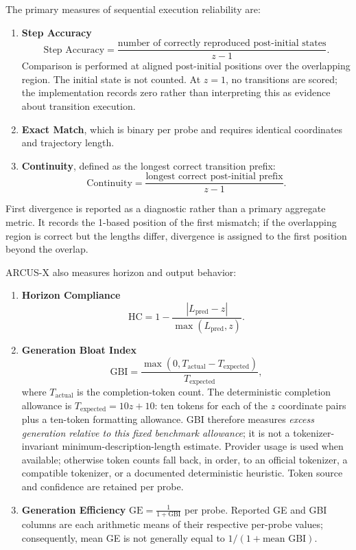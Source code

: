 \documentclass{article}
\begin{document}
The primary measures of sequential execution reliability are:
\begin{enumerate}
    \item \textbf{Step Accuracy}
    \[
    \text{Step Accuracy} =
    \frac{\text{number of correctly reproduced post-initial states}}
    {z-1}.
    \]
    Comparison is performed at aligned post-initial positions over the
    overlapping region. The initial state is not counted. At $z=1$,
    no transitions are scored; the implementation records zero rather
    than interpreting this as evidence about transition execution.

    \item \textbf{Exact Match}, which is binary per probe and requires identical coordinates and trajectory length.

    \item \textbf{Continuity}, defined as the longest correct transition
    prefix:
    \[
    \text{Continuity} =
    \frac{\text{longest correct post-initial prefix}}
    {z-1}.
    \]
\end{enumerate}

First divergence is reported as a diagnostic rather than a primary aggregate metric. It records the 1-based position of the first mismatch; if the overlapping region is correct but the lengths differ, divergence is assigned to the first position beyond the overlap.

ARCUS-X also measures horizon and output behavior:
\begin{enumerate}
    \item \textbf{Horizon Compliance}
    \[
    \text{HC} =
    1 -
    \frac{\left|L_{\mathrm{pred}}-z\right|}
    {\max(L_{\mathrm{pred}},z)}.
    \]

    \item \textbf{Generation Bloat Index}
    \[
    \text{GBI} =
    \frac{\max(0,T_{\mathrm{actual}}-T_{\mathrm{expected}})}
    {T_{\mathrm{expected}}},
    \]
    where $T_{\mathrm{actual}}$ is the completion-token count. The deterministic completion allowance is $T_{\mathrm{expected}}=10z+10$: ten tokens for each of the $z$ coordinate pairs plus a ten-token formatting allowance. GBI therefore measures \emph{excess generation relative to this fixed benchmark allowance}; it is not a tokenizer-invariant minimum-description-length estimate. Provider usage is used when available; otherwise token counts fall back, in order, to an official tokenizer, a compatible tokenizer, or a documented deterministic heuristic. Token source and confidence are retained per probe.

    \item \textbf{Generation Efficiency}
    $\text{GE} = \frac{1}{1+\text{GBI}}$ per probe. Reported GE and GBI columns are each arithmetic means of their respective per-probe values; consequently, mean GE is not generally equal to $1/(1+\text{mean GBI})$.
\end{enumerate}
\end{document}
